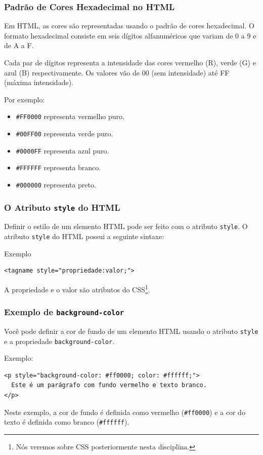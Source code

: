 \documentclass{beamer}
\begin{document}
\begin{frame}
\frametitle{Padrão de Cores Hexadecimal no HTML}

Em HTML, as cores são representadas usando o padrão de cores hexadecimal. O formato hexadecimal consiste em seis dígitos alfanuméricos que variam de 0 a 9 e de A a F.

Cada par de dígitos representa a intensidade das cores vermelho (R), verde (G) e azul (B) respectivamente. Os valores vão de 00 (sem intensidade) até FF (máxima intensidade).

Por exemplo:
\begin{itemize}
  \item \texttt{\#FF0000} representa vermelho puro.
  \item \texttt{\#00FF00} representa verde puro.
  \item \texttt{\#0000FF} representa azul puro.
  \item \texttt{\#FFFFFF} representa branco.
  \item \texttt{\#000000} representa preto.
\end{itemize}

\end{frame}


\begin{frame}[fragile]
\frametitle{O Atributo \texttt{style} do HTML}

Definir o estilo de um elemento HTML pode ser feito com o atributo \texttt{style}. O atributo \texttt{style} do HTML possui a seguinte sintaxe:
\begin{block}{Exemplo}
\begin{verbatim}
<tagname style="propriedade:valor;">
\end{verbatim}    
\end{block}


A propriedade e o valor são atributos do CSS\footnote{Nós veremos sobre CSS posteriormente nesta disciplina.}.

\end{frame}


\begin{frame}[fragile]
\frametitle{Exemplo de \texttt{background-color}}

Você pode definir a cor de fundo de um elemento HTML usando o atributo \texttt{style} e a propriedade \texttt{background-color}.

\begin{block}{Exemplo:}
\begin{verbatim}
<p style="background-color: #ff0000; color: #ffffff;">
  Este é um parágrafo com fundo vermelho e texto branco.
</p>
\end{verbatim}
\end{block}


Neste exemplo, a cor de fundo é definida como vermelho (\texttt{\#ff0000}) e a cor do texto é definida como branco (\texttt{\#ffffff}).

\end{frame}
\end{document}
